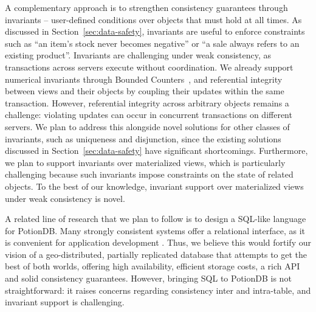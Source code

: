 A complementary approach is to strengthen consistency guarantees through invariants -- user-defined conditions over objects that must hold at all times.
As discussed in Section~\ref{sec:data-safety}, invariants are useful to enforce constraints such as ``an item's stock never becomes negative'' or ``a sale always refers to an existing product''.
Invariants are challenging under weak consistency, as transactions across servers execute without coordination.
We already support numerical invariants through Bounded Counters~\cite{boundedCounter}, and referential integrity between views and their objects by coupling their updates within the same transaction.
However, referential integrity across arbitrary objects remains a challenge: violating updates can occur in concurrent transactions on different servers.
We plan to address this alongside novel solutions for other classes of invariants, such as uniqueness and disjunction, since the existing solutions discussed in Section~\ref{sec:data-safety} have significant shortcomings.
Furthermore, we plan to support invariants over materialized views, which is particularly challenging because such invariants impose constraints on the state of related objects.
To the best of our knowledge, invariant support over materialized views under weak consistency is novel.

A related line of research that we plan to follow is to design a SQL-like language for PotionDB.
Many strongly consistent systems offer a relational interface, as it is convenient for application development \cite{analyticdb, clickhouse, cassandra}.
Thus, we believe this would fortify our vision of a geo-distributed, partially replicated database that attempts to get the best of both worlds, offering high availability, efficient storage costs, a rich API and solid consistency guarantees.
However, bringing SQL to PotionDB is not straightforward: it raises concerns regarding consistency inter and intra-table, and invariant support is challenging.



